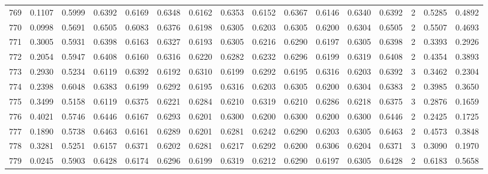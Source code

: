\begin{tabular}{lrrrrrrrrrrrrrrr}
769 &      0.1107 &  0.5999 &  0.6392 &  0.6169 &  0.6348 &  0.6162 &  0.6353 &  0.6152 &  0.6367 &  0.6146 &   0.6340 &     0.6392 &      2 &                    0.5285 &                     0.4892 \\
770 &      0.0998 &  0.5691 &  0.6505 &  0.6083 &  0.6376 &  0.6198 &  0.6305 &  0.6203 &  0.6305 &  0.6200 &   0.6304 &     0.6505 &      2 &                    0.5507 &                     0.4693 \\
771 &      0.3005 &  0.5931 &  0.6398 &  0.6163 &  0.6327 &  0.6193 &  0.6305 &  0.6216 &  0.6290 &  0.6197 &   0.6305 &     0.6398 &      2 &                    0.3393 &                     0.2926 \\
772 &      0.2054 &  0.5947 &  0.6408 &  0.6160 &  0.6316 &  0.6220 &  0.6282 &  0.6232 &  0.6296 &  0.6199 &   0.6319 &     0.6408 &      2 &                    0.4354 &                     0.3893 \\
773 &      0.2930 &  0.5234 &  0.6119 &  0.6392 &  0.6192 &  0.6310 &  0.6199 &  0.6292 &  0.6195 &  0.6316 &   0.6203 &     0.6392 &      3 &                    0.3462 &                     0.2304 \\
774 &      0.2398 &  0.6048 &  0.6383 &  0.6199 &  0.6292 &  0.6195 &  0.6316 &  0.6203 &  0.6305 &  0.6200 &   0.6304 &     0.6383 &      2 &                    0.3985 &                     0.3650 \\
775 &      0.3499 &  0.5158 &  0.6119 &  0.6375 &  0.6221 &  0.6284 &  0.6210 &  0.6319 &  0.6210 &  0.6286 &   0.6218 &     0.6375 &      3 &                    0.2876 &                     0.1659 \\
776 &      0.4021 &  0.5746 &  0.6446 &  0.6167 &  0.6293 &  0.6201 &  0.6300 &  0.6200 &  0.6300 &  0.6200 &   0.6300 &     0.6446 &      2 &                    0.2425 &                     0.1725 \\
777 &      0.1890 &  0.5738 &  0.6463 &  0.6161 &  0.6289 &  0.6201 &  0.6281 &  0.6242 &  0.6290 &  0.6203 &   0.6305 &     0.6463 &      2 &                    0.4573 &                     0.3848 \\
778 &      0.3281 &  0.5251 &  0.6157 &  0.6371 &  0.6202 &  0.6281 &  0.6217 &  0.6292 &  0.6200 &  0.6306 &   0.6204 &     0.6371 &      3 &                    0.3090 &                     0.1970 \\
779 &      0.0245 &  0.5903 &  0.6428 &  0.6174 &  0.6296 &  0.6199 &  0.6319 &  0.6212 &  0.6290 &  0.6197 &   0.6305 &     0.6428 &      2 &                    0.6183 &                     0.5658 \\

\end{tabular}
